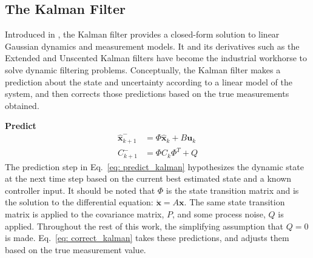 \documentclass[twocolumn,letterpaper]{IEEEAerospaceCLS}  %
\theoremstyle{definition}
\begin{document}










\subsection{The Kalman Filter}

Introduced in \cite{kalman1960seminal}, the Kalman filter provides a closed-form solution to linear Gaussian dynamics and measurement models. 
It and its derivatives such as the Extended and Unscented Kalman filters have become the industrial workhorse to solve dynamic filtering problems. Conceptually, the Kalman filter makes a prediction about the state and uncertainty according to a linear model of the system, and then corrects those predictions based on the true measurements obtained. 

\textbf{Predict}
\begin{equation}\label{eq: predict_kalman}
\begin{split}
  \hat{\boldsymbol{x}}^-_{k+1} &= \Phi \hat{\boldsymbol{x}}_k + B \boldsymbol{u}_k\\
  C^-_{k+1} &= \Phi C_k \Phi^T + Q
\end{split}
\end{equation}
The prediction step in Eq.~\eqref{eq: predict_kalman} hypothesizes the dynamic state at the next time step based on the current best estimated state and a known controller input. 
It should be noted that $\Phi$ is the state transition matrix and is the solution to the differential equation: $\dot{\boldsymbol{x}}=A \boldsymbol{x}$. 
The same state transition matrix is applied to the covariance matrix, $P$, and some process noise, $Q$ is applied. 
Throughout the rest of this work, the simplifying assumption that $Q=0$ is made. 
Eq.~\eqref{eq: correct_kalman} takes these predictions, and adjusts them based on the true measurement value.
\end{document}
